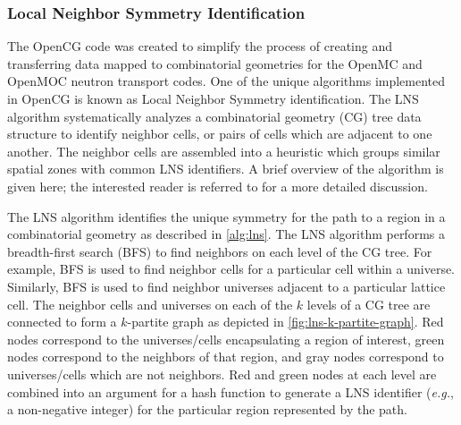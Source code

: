 

\subsubsection{Local Neighbor Symmetry Identification}
\label{subsubsec:homogenize-lns}

The OpenCG code \citep{boyd2015opencg} was created to simplify the process of creating and transferring data mapped to combinatorial geometries for the OpenMC and OpenMOC neutron transport codes. One of the unique algorithms implemented in OpenCG is known as Local Neighbor Symmetry identification. The LNS algorithm systematically analyzes a combinatorial geometry (CG) tree data structure to identify neighbor cells, or pairs of cells which are adjacent to one another. The neighbor cells are assembled into a heuristic which groups similar spatial zones with common LNS identifiers. A brief overview of the algorithm is given here; the interested reader is referred to \citep{boyd2015opencg} for a more detailed discussion.

The LNS algorithm identifies the unique symmetry for the path to a region in a combinatorial geometry as described in \autoref{alg:lns}. The LNS algorithm performs a breadth-first search (BFS) to find neighbors on each level of the CG tree. For example, BFS is used to find neighbor cells for a particular cell within a universe. Similarly, BFS is used to find neighbor universes adjacent to a particular lattice cell. The neighbor cells and universes on each of the $k$ levels of a CG tree are connected to form a $k$-partite graph as depicted in \autoref{fig:lns-k-partite-graph}. Red nodes correspond to the universes/cells encapsulating a region of interest, green nodes correspond to the neighbors of that region, and gray nodes correspond to universes/cells which are not neighbors. Red and green nodes at each level are combined into an argument for a hash function to generate a LNS identifier (\textit{e.g.}, a non-negative integer) for the particular region represented by the path.

